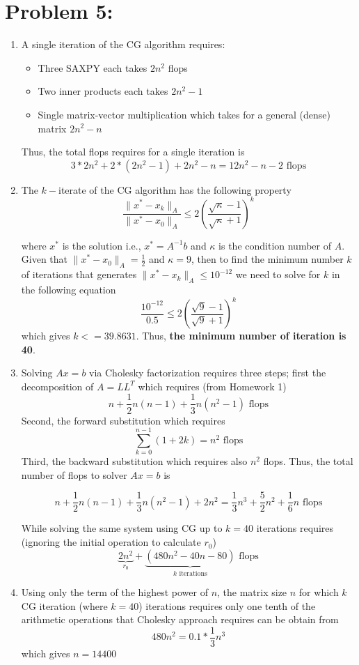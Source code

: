 \newpage
\section*{Problem 5:}
\begin{enumerate}
\item A single iteration of the CG algorithm requires:
\begin{itemize}
\item Three SAXPY each takes $2n^{2}$ flops
\item Two inner products each takes $2n^{2} -1$
\item Single matrix-vector multiplication which takes for a general (dense) matrix $2n^2-n$
\end{itemize}
Thus, the total flops requires for a single iteration is 
$$
3*2n^{2} + 2*(2n^{2} -1) + 2n^2-n = 12 n^{2} - n - 2 \text{\ flops}
$$

\item The $k-$iterate of the CG algorithm has the following property
$$
\frac{\parallel x^{*} - x_{k} \parallel_{A}}{\parallel x^{*} - x_{0} \parallel_{A}} \leq 2 \left( \frac{\sqrt{\kappa}-1}{\sqrt{\kappa}+1}\right) ^{k}
$$

where $x^{*}$ is the solution i.e.,  $x^{*} = A^{-1}b$ and $\kappa$ is the condition number of $A$. Given that $\parallel x^{*} - x_{0} \parallel_{A} = \frac{1}{2}$ and $\kappa = 9$, then to find the minimum number $k$ of iterations that generates $\parallel x^{*} - x_{k} \parallel_{A} \leq 10^{-12}$ we need to solve for $k$ in the following equation 
$$
\frac{10^{-12}}{0.5} \leq 2 \left( \frac{\sqrt{9}-1}{\sqrt{9}+1}\right) ^{k}
$$
which gives $k<= 39.8631$. Thus, \textbf{the minimum number of iteration is 40}.

\item Solving $Ax = b$ via Cholesky factorization requires three steps; first the decomposition of $A = LL^{T}$ which requires (from Homework 1)
$$
n + \frac{1}{2}n(n-1) + \frac{1}{3}n(n^2-1) \text{\ flops}
$$
Second, the forward substitution which requires 
$$
\sum_{k=0}^{n-1}(1+2k) = n^{2} \text{\ flops}
$$
Third, the backward substitution which requires also $n^{2}$ flops. Thus, the total number of flops to solver $Ax = b$ is 

$$
n + \frac{1}{2}n(n-1) + \frac{1}{3}n(n^2-1) + 2n^{2} = \frac{1}{3}n^{3} + \frac{5}{2}n^{2} + \frac{1}{6}n \text{\ flops}
$$

While solving the same system using CG up to $k=40$ iterations requires (ignoring the initial operation to calculate $r_{0}$) 
$$
 \underbrace{2n^2}_\textrm{$r_{0}$} + \underbrace{(480 n^{2} - 40n - 80)}_\textrm{$k$ iterations} \text{\ flops}
$$
\item Using only the term of the highest power of $n$, the matrix size $n$ for which $k$ CG iteration (where $k=40$) iterations requires only one tenth of the arithmetic operations that Cholesky approach requires can be obtain from 
$$
480n^{2} = 0.1*\frac{1}{3}n^{3}
$$
which gives $n=14400$
\end{enumerate} 